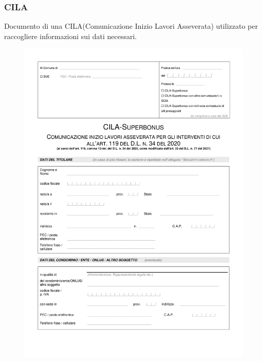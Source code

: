 \documentclass{elegantbook}
\begin{document}
	\subsubsection{CILA}
	Documento di una CILA(Comunicazione Inizio Lavori Asseverata) utilizzato per raccogliere informazioni sui dati necessari.
		\begin{figure}[H]
			\centering
			\includegraphics[scale=0.8]{../Img/Documents/CILAS/CILAS-1.png}
		\end{figure}
\end{document}
